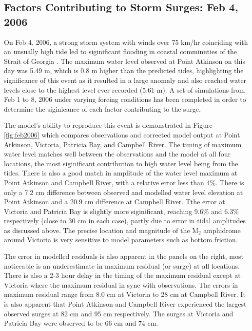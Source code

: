 \documentclass[pdftex,10pt]{article}
\begin{document}
\subsection{Factors Contributing to Storm Surges: Feb 4, 2006}

On Feb 4, 2006, a strong storm system with winds over 75 km/hr coinciding with an unsually high tide led to siginificant flooding in coastal comminuties of the Strait of Georgia \citep{romanowski2010storm}. The maximum water level observed at Point Atkinson on this day was 5.49 m, which is 0.8 m higher than the predicted tides, highlighting the significance of this event as it resulted in a large anomaly and also reached water levels close to the highest level ever recorded (5.61 m). A set of simulations from Feb 1 to 8, 2006 under varying forcing conditions has been completed in order to determine the siginicance of each factor contributing to the surge.

The model's ability to reproduce this event is demonstrated in Figure \ref{fig:feb2006} which compares observations and corrected model output at Point Atkinson, Victoria, Patricia Bay, and Campbell River. The timing of maximum water level matches well between the observations and the model at all four locations, the most siginificant contribution to high water level being from the tides. There is also a good match in amplitude of the water level maximum at Point Atkinson and Campbell River, with a relative error less than 4\%. There is only a 7.2 cm difference between observed and modelled water level elevation at Point Atkinson and a 20.9 cm difference at Campbell River. Tthe error at Victoria and Patricia Bay is slightly more siginificant, reaching 9.6\% and 6.3\% respectively (close to 30 cm in each case), partly due to error in tidal amplitudes as discussed above. The precise location and magnitude of the M$_2$ amphidrome around Victoria is very sensitive to model parameters such as bottom friction. 

The error in modelled residuals is also apparent in the panels on the right, most noticeable is an underestimate in maximum residual (or surge) at all locations. There is also a 2-3 hour delay in the timing of the maximum residual except at Victoria where the maximum residual in sync with observations. The errors in maximum residual range from 8.0 cm at Victoria to 28 cm at Campbell River. It is also apparent that Point Atkinson and Campbell River experienced the largest observed surges at 82 cm and 95 cm respectively. The surges at Victoria and Patricia Bay were observed to be 66 cm and 74 cm. 
\end{document}
